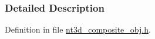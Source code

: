 \subsubsection{Detailed Description}


Definition in file \hyperlink{nt3d__composite__obj_8h_source}{nt3d\_\-composite\_\-obj.h}.

